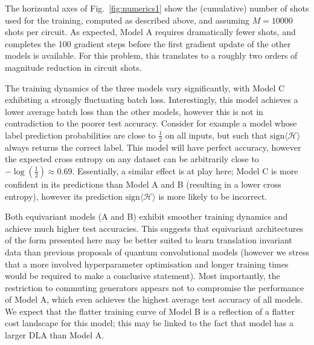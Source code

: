 \documentclass[a4paper,twocolumn,11pt]{quantumarticle}
\renewcommand{\vec}{\boldsymbol}
\begin{document}
\begin{table}
\begin{center}
\end{center}
\caption{Specifications and resource requirements for each model for the 16-qubit classification problem we consider. $n$ is the number of trainable parameters, and \# circuits is the number of unique circuits that need to be evaluated in order to estimate the gradient for a given input $\vec{x}$.}  \label{tab:model_specs}
\end{table}

The horizontal axes of Fig.\ \ref{fig:numerics1} show the (cumulative) number of shots used for the training, computed as described above, and assuming $M=10000$ shots per circuit. As expected, Model A requires dramatically fewer shots, and completes the 100 gradient steps before the first gradient update of the other models is available. For this problem, this translates to a roughly two orders of magnitude reduction in circuit shots. 

The training dynamics of the three models vary significantly, with Model C exhibiting a strongly fluctuating batch loss. Interestingly, this model achieves a lower average batch loss than the other models, however this is not in contradiction to the poorer test accuracy. Consider for example a model whose label prediction probabilities are close to $\frac{1}{2}$ on all inputs, but such that $\text{sign} \langle \mathcal{H} \rangle$ always returns the correct label. This model will have perfect accuracy, however the expected cross entropy on any dataset can be arbitrarily close to $-\log(\frac{1}{2})\approx 0.69$. Essentially, a similar effect is at play here; Model C is more confident in its predictions than Model A and B (resulting in a lower cross entropy), however its prediction $\text{sign} \langle \mathcal{H} \rangle$ is more likely to be incorrect.

Both equivariant models (A and B) exhibit smoother training dynamics and achieve much higher test accuracies. This suggests that equivariant architectures of the form presented here may be better suited to learn translation invariant data than previous proposals of quantum convolutional models (however we stress that a more involved hyperparameter optimisation and longer training times would be required to make a conclusive statement). Most importantly, the restriction to commuting generators appears not to compromise the performance of Model A, which even achieves the highest average test accuracy of all models. We expect that the flatter training curve of Model B is a reflection of a flatter cost landscape for this model; this may be linked to the fact that model has a larger DLA than Model A. 
\end{document}
